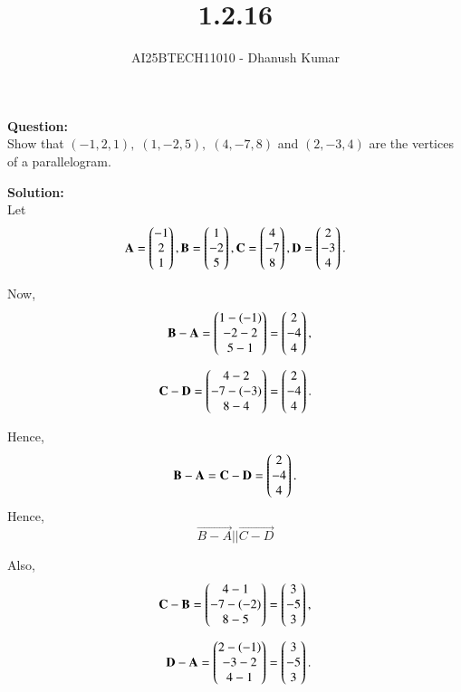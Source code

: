 \documentclass[journal]{IEEEtran}
\begin{document}
\title{
1.2.16}
\author{AI25BTECH11010 - Dhanush Kumar}
\maketitle
\renewcommand{\thefigure}{\theenumi}
\renewcommand{\thetable}{\theenumi}


\noindent
\textbf{Question:} \\
Show that $(-1,2,1), \; (1,-2,5), \; (4,-7,8)$ and $(2,-3,4)$ are the vertices of a parallelogram.

\bigskip
\textbf{Solution:} \\
Let
\begin{align}
	\mathbf{A} = \begin{pmatrix}-1 \\ 2 \\ 1\end{pmatrix},
	\mathbf{B}= \begin{pmatrix}1 \\ -2 \\ 5\end{pmatrix}, 
\mathbf{C} = \begin{pmatrix}4 \\ -7 \\ 8\end{pmatrix},
\mathbf{D} = \begin{pmatrix}2 \\ -3 \\ 4\end{pmatrix}.
\end{align}

Now,
\begin{align}
	\mathbf{B - A}= \begin{pmatrix}1 - (-1) \\ -2 - 2 \\ 5 - 1\end{pmatrix}
      = \begin{pmatrix}2 \\ -4 \\ 4\end{pmatrix}, \\[6pt]
	\mathbf{C - D} = \begin{pmatrix}4 - 2 \\ -7 - (-3) \\ 8 - 4\end{pmatrix}
      = \begin{pmatrix}2 \\ -4 \\ 4\end{pmatrix}.
\end{align}

Hence,
\begin{align}
	\mathbf{B - A} = \mathbf{C - D}= \begin{pmatrix}2 \\ -4 \\ 4\end{pmatrix}.
\end{align}
Hence,                                              
\[ \vec{B - A} ||\vec{C - D }\] 

Also,
\begin{align}
	\mathbf{C - B}= \begin{pmatrix}4 - 1 \\ -7 - (-2) \\ 8 - 5\end{pmatrix}
      = \begin{pmatrix}3 \\ -5 \\ 3\end{pmatrix}, \\[6pt]
	\mathbf{D - A }= \begin{pmatrix}2 - (-1) \\ -3 - 2 \\ 4 - 1\end{pmatrix}
      = \begin{pmatrix}3 \\ -5 \\ 3\end{pmatrix}.
\end{align}
\end{document}
